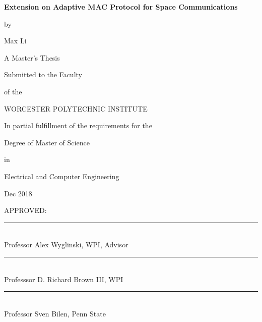 \documentclass[12pt]{report}
\begin{document}
	\newcommand{\brk}{\vspace*{0.18in}}
	
	\thispagestyle{empty}
	
	\begin{center}
		
		\brk
		
		
		{\large 
			\textbf{
				Extension on Adaptive MAC Protocol for Space Communications
			}
		}		
		
		\brk
		by
		
		\brk
		Max Li
		
		\brk
		\brk
		A Master's Thesis
		
		\brk
		Submitted to the Faculty 
		
		\brk
		of the
		
		\brk
		\brk
		WORCESTER POLYTECHNIC INSTITUTE
		
		\brk
		\brk
		In partial fulfillment of the requirements for the
		
		\brk
		Degree of Master of Science
		
		\brk
		in
		
		\brk
		Electrical and Computer Engineering
		
		\brk
		Dec 2018
	\end{center}
	
	\setlength{\parindent}{0pt}
	\brk
	\brk
	\brk
	APPROVED:\\

	\rule{3in}{0.8pt}\\
	Professor Alex Wyglinski, WPI, Advisor\\

    \rule{3in}{0.8pt}\\
	Professsor D. Richard Brown III, WPI\\

    \rule{3in}{0.8pt}\\
    Professor Sven Bilen, Penn State\\
\end{document}
